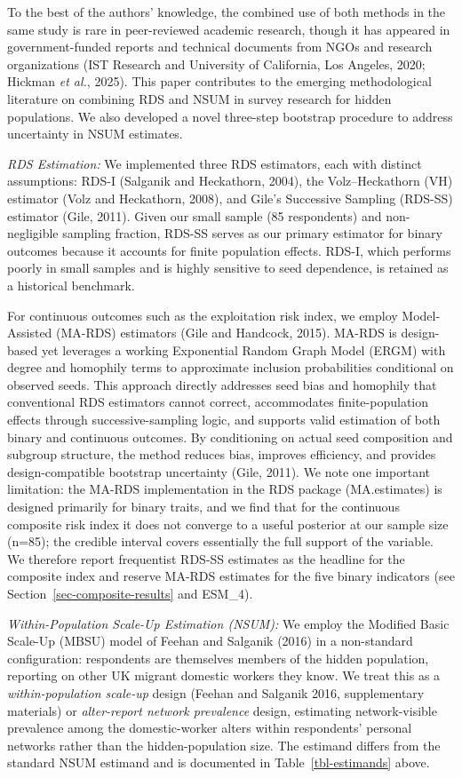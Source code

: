 \documentclass[
  12pt,
  letterpaper,
  DIV=11,
  numbers=noendperiod]{scrartcl}
\begin{document}
To the best of the authors' knowledge, the combined use of both methods
in the same study is rare in peer-reviewed academic research, though it
has appeared in government-funded reports and technical documents from
NGOs and research organizations (IST Research and University of
California, Los Angeles, 2020; Hickman \emph{et al.}, 2025). This paper
contributes to the emerging methodological literature on combining RDS
and NSUM in survey research for hidden populations. We also developed a
novel three-step bootstrap procedure to address uncertainty in NSUM
estimates.

\emph{RDS Estimation:} We implemented three RDS estimators, each with
distinct assumptions: RDS-I (Salganik and Heckathorn, 2004), the
Volz--Heckathorn (VH) estimator (Volz and Heckathorn, 2008), and Gile's
Successive Sampling (RDS-SS) estimator (Gile, 2011). Given our small
sample (85 respondents) and non-negligible sampling fraction, RDS-SS
serves as our primary estimator for binary outcomes because it accounts
for finite population effects. RDS-I, which performs poorly in small
samples and is highly sensitive to seed dependence, is retained as a
historical benchmark.

For continuous outcomes such as the exploitation risk index, we employ
Model-Assisted (MA-RDS) estimators (Gile and Handcock, 2015). MA-RDS is
design-based yet leverages a working Exponential Random Graph Model
(ERGM) with degree and homophily terms to approximate inclusion
probabilities conditional on observed seeds. This approach directly
addresses seed bias and homophily that conventional RDS estimators
cannot correct, accommodates finite-population effects through
successive-sampling logic, and supports valid estimation of both binary
and continuous outcomes. By conditioning on actual seed composition and
subgroup structure, the method reduces bias, improves efficiency, and
provides design-compatible bootstrap uncertainty (Gile, 2011). We note
one important limitation: the MA-RDS implementation in the RDS package
(MA.estimates) is designed primarily for binary traits, and we find that
for the continuous composite risk index it does not converge to a useful
posterior at our sample size (n=85); the credible interval covers
essentially the full support of the variable. We therefore report
frequentist RDS-SS estimates as the headline for the composite index and
reserve MA-RDS estimates for the five binary indicators (see
Section~\ref{sec-composite-results} and ESM\_4).

\emph{Within-Population Scale-Up Estimation (NSUM):} We employ the
Modified Basic Scale-Up (MBSU) model of Feehan and Salganik (2016) in a
non-standard configuration: respondents are themselves members of the
hidden population, reporting on other UK migrant domestic workers they
know. We treat this as a \emph{within-population scale-up} design
(Feehan and Salganik 2016, supplementary materials) or
\emph{alter-report network prevalence} design, estimating
network-visible prevalence among the domestic-worker alters within
respondents' personal networks rather than the hidden-population size.
The estimand differs from the standard NSUM estimand and is documented
in Table~\ref{tbl-estimands} above.
\end{document}
